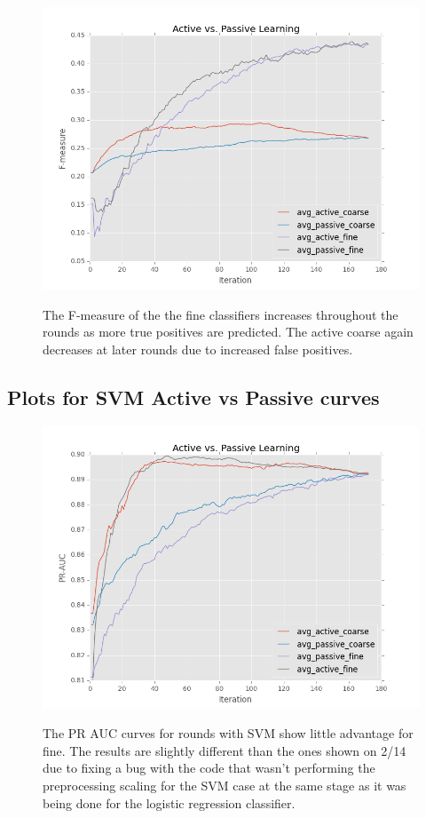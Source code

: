 \documentclass[ms]{nuthesis}
\begin{document}
\FloatBarrier
\begin{figure}[!htb]
	\centering
    \includegraphics[width=1.0\columnwidth]{fig/ActiveVsPassiveF1LR}
    \label{fig:ActiveVsPassiveF1LR}
    \caption{The F-measure of the the fine classifiers increases
throughout the rounds as more true positives are predicted. The active coarse
again decreases at later rounds due to increased false positives.}
\end{figure}
\FloatBarrier


\FloatBarrier
\subsection{Plots for SVM Active vs Passive curves}
\begin{figure}[!htb]
	\centering
    \includegraphics[width=1.0\columnwidth]{fig/ActiveVsPassivePRSVM}
    \label{fig:ActiveVsPassivePRSVM}
    \caption{The PR AUC curves for rounds with SVM show little
advantage for fine. The results are slightly different than the ones shown
on 2/14 due to fixing a bug with the code that wasn't performing the
preprocessing scaling for the SVM case at the same stage as it was being
done for the logistic regression classifier.}
\end{figure}
\FloatBarrier
\end{document}
